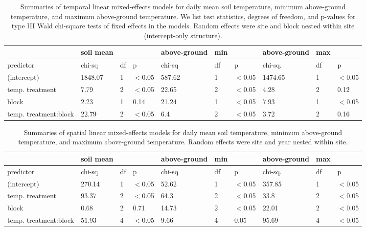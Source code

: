 \documentclass{article}
\begin{document}
\begin{table}[ht]
\centering
\caption{Summaries of temporal linear mixed-effects models for daily mean soil temperature, minimum above-ground temperature, and maximum above-ground temperature. We list test statistics, degrees of freedom, and p-values for type III Wald chi-square tests of fixed effects in the models. Random effects were site and block nested within site (intercept-only structure).} 
\label{table:blocks_time}
\begin{tabular}{|p{}|p{}p{}p{}|p{}p{}p{}|p{}p{}p{}|}
   \hline
 & soil   mean &  &  & above-ground & min &  & above-ground & max &  \\ 
   \hline
predictor & chi-sq & df & p & chi-sq & df & p & chi-sq. & df & p \\ 
   \hline
(intercept) & 1848.07 & 1 & $<$0.05 & 587.62 & 1 & $<$0.05 & 1474.65 & 1 & $<$0.05 \\ 
  temp. treatment & 7.79 & 2 & $<$0.05 & 22.65 & 2 & $<$0.05 & 4.28 & 2 & 0.12 \\ 
  block & 2.23 & 1 & 0.14 & 21.24 & 1 & $<$0.05 & 7.93 & 1 & $<$0.05 \\ 
  temp. treatment:block & 22.79 & 2 & $<$0.05 & 6.4 & 2 & $<$0.05 & 3.72 & 2 & 0.16 \\ 
   \hline
\end{tabular}
\end{table}%
\begin{table}[ht]
\centering
\caption{Summaries of spatial linear mixed-effects models for daily mean soil temperature, minimum above-ground temperature, and maximum above-ground temperature. Random effects were site and year nested within site.} 
\label{table:blocks_space}
\begin{tabular}{|p{}|p{}p{}p{}|p{}p{}p{}|p{}p{}p{}|}
   \hline
 & soil   mean &  &  & above-ground & min &  & above-ground & max &  \\ 
   \hline
predictor & chi-sq & df & p & chi-sq & df & p & chi-sq. & df & p \\ 
   \hline
(intercept) & 270.14 & 1 & $<$0.05 & 52.62 & 1 & $<$0.05 & 357.85 & 1 & $<$0.05 \\ 
  temp. treatment & 93.37 & 2 & $<$0.05 & 64.3 & 2 & $<$0.05 & 33.8 & 2 & $<$0.05 \\ 
  block & 0.68 & 2 & 0.71 & 14.73 & 2 & $<$0.05 & 22.01 & 2 & $<$0.05 \\ 
  temp. treatment:block & 51.93 & 4 & $<$0.05 & 9.66 & 4 & 0.05 & 95.69 & 4 & $<$0.05 \\ 
   \hline
\end{tabular}
\end{table}\clearpage
\end{document}
